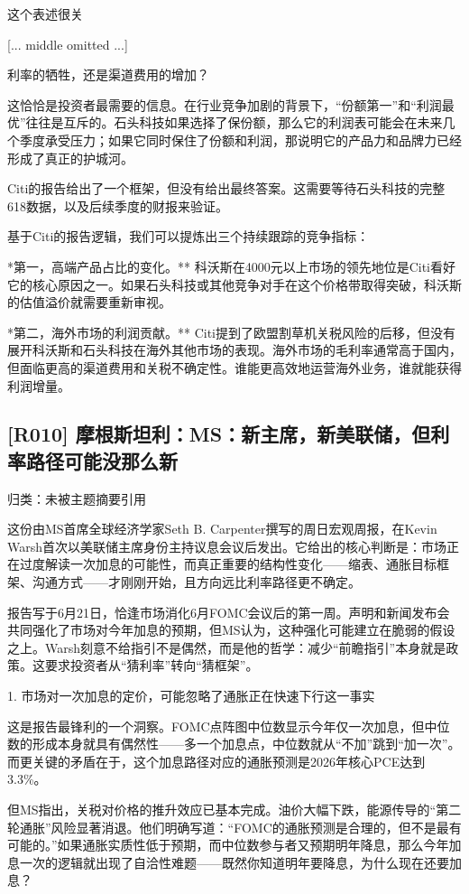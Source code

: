 \documentclass[11pt]{ctexart}
\begin{document}
这个表述很关

[... middle omitted ...]

利率的牺牲，还是渠道费用的增加？

这恰恰是投资者最需要的信息。在行业竞争加剧的背景下，“份额第一”和“利润最优”往往是互斥的。石头科技如果选择了保份额，那么它的利润表可能会在未来几个季度承受压力；如果它同时保住了份额和利润，那说明它的产品力和品牌力已经形成了真正的护城河。

Citi的报告给出了一个框架，但没有给出最终答案。这需要等待石头科技的完整618数据，以及后续季度的财报来验证。

基于Citi的报告逻辑，我们可以提炼出三个持续跟踪的竞争指标：

*第一，高端产品占比的变化。** 科沃斯在4000元以上市场的领先地位是Citi看好它的核心原因之一。如果石头科技或其他竞争对手在这个价格带取得突破，科沃斯的估值溢价就需要重新审视。

*第二，海外市场的利润贡献。** Citi提到了欧盟割草机关税风险的后移，但没有展开科沃斯和石头科技在海外其他市场的表现。海外市场的毛利率通常高于国内，但面临更高的渠道费用和关税不确定性。谁能更高效地运营海外业务，谁就能获得利润增量。

\subsection{[R010] 摩根斯坦利：MS：新主席，新美联储，但利率路径可能没那么新}
{\small\color{refgray}归类：未被主题摘要引用}

这份由MS首席全球经济学家Seth B. Carpenter撰写的周日宏观周报，在Kevin Warsh首次以美联储主席身份主持议息会议后发出。它给出的核心判断是：市场正在过度解读一次加息的可能性，而真正重要的结构性变化——缩表、通胀目标框架、沟通方式——才刚刚开始，且方向远比利率路径更不确定。

报告写于6月21日，恰逢市场消化6月FOMC会议后的第一周。声明和新闻发布会共同强化了市场对今年加息的预期，但MS认为，这种强化可能建立在脆弱的假设之上。Warsh刻意不给指引不是偶然，而是他的哲学：减少“前瞻指引”本身就是政策。这要求投资者从“猜利率”转向“猜框架”。

1. 市场对一次加息的定价，可能忽略了通胀正在快速下行这一事实

这是报告最锋利的一个洞察。FOMC点阵图中位数显示今年仅一次加息，但中位数的形成本身就具有偶然性——多一个加息点，中位数就从“不加”跳到“加一次”。而更关键的矛盾在于，这个加息路径对应的通胀预测是2026年核心PCE达到3.3\%。

但MS指出，关税对价格的推升效应已基本完成。油价大幅下跌，能源传导的“第二轮通胀”风险显著消退。他们明确写道：“FOMC的通胀预测是合理的，但不是最有可能的。”如果通胀实质性低于预期，而中位数参与者又预期明年降息，那么今年加息一次的逻辑就出现了自洽性难题——既然你知道明年要降息，为什么现在还要加息？
\end{document}
